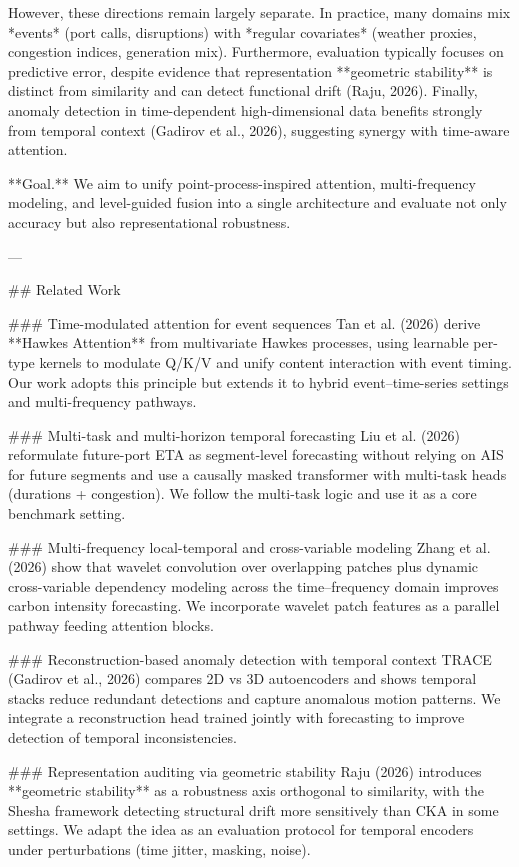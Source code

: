 However, these directions remain largely separate. In practice, many domains mix *events* (port calls, disruptions) with *regular covariates* (weather proxies, congestion indices, generation mix). Furthermore, evaluation typically focuses on predictive error, despite evidence that representation **geometric stability** is distinct from similarity and can detect functional drift (Raju, 2026). Finally, anomaly detection in time-dependent high-dimensional data benefits strongly from temporal context (Gadirov et al., 2026), suggesting synergy with time-aware attention.

**Goal.** We aim to unify point-process-inspired attention, multi-frequency modeling, and level-guided fusion into a single architecture and evaluate not only accuracy but also representational robustness.

---

## Related Work  

### Time-modulated attention for event sequences  
Tan et al. (2026) derive **Hawkes Attention** from multivariate Hawkes processes, using learnable per-type kernels to modulate Q/K/V and unify content interaction with event timing. Our work adopts this principle but extends it to hybrid event–time-series settings and multi-frequency pathways.

### Multi-task and multi-horizon temporal forecasting  
Liu et al. (2026) reformulate future-port ETA as segment-level forecasting without relying on AIS for future segments and use a causally masked transformer with multi-task heads (durations + congestion). We follow the multi-task logic and use it as a core benchmark setting.

### Multi-frequency local-temporal and cross-variable modeling  
Zhang et al. (2026) show that wavelet convolution over overlapping patches plus dynamic cross-variable dependency modeling across the time–frequency domain improves carbon intensity forecasting. We incorporate wavelet patch features as a parallel pathway feeding attention blocks.

### Reconstruction-based anomaly detection with temporal context  
TRACE (Gadirov et al., 2026) compares 2D vs 3D autoencoders and shows temporal stacks reduce redundant detections and capture anomalous motion patterns. We integrate a reconstruction head trained jointly with forecasting to improve detection of temporal inconsistencies.

### Representation auditing via geometric stability  
Raju (2026) introduces **geometric stability** as a robustness axis orthogonal to similarity, with the Shesha framework detecting structural drift more sensitively than CKA in some settings. We adapt the idea as an evaluation protocol for temporal encoders under perturbations (time jitter, masking, noise).

